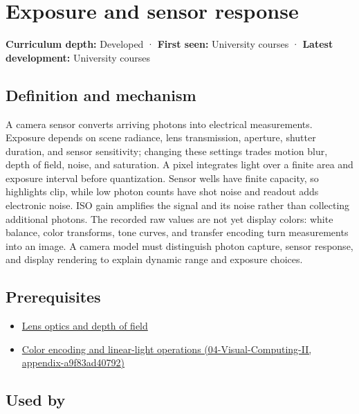 \hypertarget{appendix-92d45cdf2afc}{}
\section{Exposure and sensor response}\label{appendix-92d45cdf2afc-exposure-and-sensor-response}

\textbf{Curriculum depth:} Developed · \textbf{First seen:} University courses · \textbf{Latest development:} University courses

\subsection{Definition and mechanism}\label{appendix-92d45cdf2afc-definition-and-mechanism}

A camera sensor converts arriving photons into electrical measurements. Exposure depends on scene radiance, lens transmission, aperture, shutter duration, and sensor sensitivity; changing these settings trades motion blur, depth of field, noise, and saturation. A pixel integrates light over a finite area and exposure interval before quantization. Sensor wells have finite capacity, so highlights clip, while low photon counts have shot noise and readout adds electronic noise. ISO gain amplifies the signal and its noise rather than collecting additional photons. The recorded raw values are not yet display colors: white balance, color transforms, tone curves, and transfer encoding turn measurements into an image. A camera model must distinguish photon capture, sensor response, and display rendering to explain dynamic range and exposure choices.

\subsection{Prerequisites}\label{appendix-92d45cdf2afc-prerequisites}

\begin{itemize}
\tightlist
\item
  \hyperref[appendix-21f8456e2629]{Lens optics and depth of field}
\item
  \href{../04-Visual-Computing-II/main.pdf\#nameddest=appendix-a9f83ad40792}{Color encoding and linear-light operations (04-Visual-Computing-II, appendix-a9f83ad40792)}
\end{itemize}

\subsection{Used by}\label{appendix-92d45cdf2afc-used-by}

